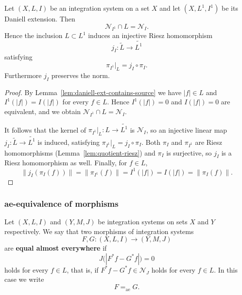\begin{lemma}\label{lem:quotient-embedding}
  Let $(X,L,I)$ be an integration system on a set $X$ and let
  $(X,L^1,I^1)$ be its Daniell extension.
  Then
  \[
    \mathcal{N}_{I^1}\cap L=\mathcal{N}_I .
  \]
  Hence the inclusion $L\subset L^1$ induces an injective Riesz homomorphism
  \[
    j_I:\widetilde{L}\longrightarrow\widetilde{L^1}
  \]
  satisfying
  \[
    \pi_{I^1}|_L=j_I\circ\pi_I .
  \]
  Furthermore $j_I$ preserves the norm.
\end{lemma}
\begin{proof}
  By Lemma~\ref{lem:daniell-ext-contains-source} we have $|f|\in L$ and
  $I^1(|f|)=I(|f|)$ for every $f\in L$.
  Hence $I^1(|f|)=0$ and $I(|f|)=0$ are equivalent, and we obtain
  $\mathcal{N}_{I^1}\cap L=\mathcal{N}_I$.

  It follows that the kernel of $\pi_{I^1}|_L:L\to\widetilde{L^1}$ is
  $\mathcal{N}_I$, so an injective linear map
  $j_I:\widetilde{L}\to\widetilde{L^1}$ is induced, satisfying
  $\pi_{I^1}|_L=j_I\circ\pi_I$.
  Both $\pi_I$ and $\pi_{I^1}$ are Riesz homomorphisms
  (Lemma~\ref{lem:quotient-riesz}) and $\pi_I$ is surjective, so $j_I$ is a
  Riesz homomorphism as well.
  Finally, for $f\in L$,
  \[
    \|j_I(\pi_I(f))\|=\|\pi_{I^1}(f)\|=I^1(|f|)=I(|f|)=\|\pi_I(f)\| .
  \]
\end{proof}

\subsubsection{ae-equivalence of morphisms}

\begin{definition}\label{def:ae-equal}
  Let $(X,L,I)$ and $(Y,M,J)$ be integration systems on sets $X$ and
  $Y$ respectively.
  We say that two morphisms of integration systems
  \[
    F,G:(X,L,I)\to(Y,M,J)
  \]
  are \textbf{equal almost everywhere} if
  \[
    J\bigl(|F^*f-G^*f|\bigr)=0
  \]
  holds for every $f\in L$, that is, if $F^*f-G^*f\in\mathcal{N}_J$ holds for
  every $f\in L$.
  In this case we write
  \[
    F=_{\mathrm{ae}}G .
  \]
\end{definition}

